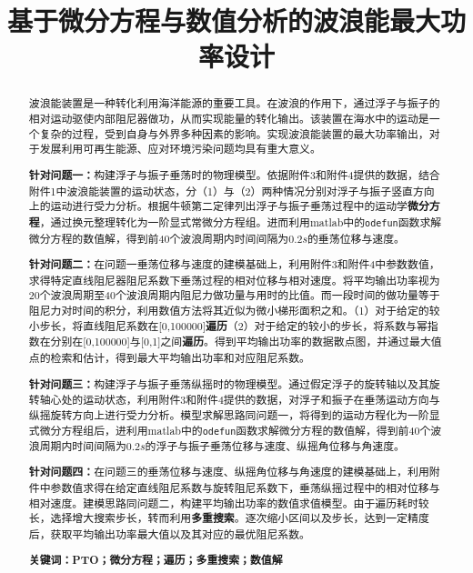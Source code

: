 \documentclass{article}
\date{}
\title{\heiti 基于微分方程与数值分析的波浪能最大功率设计}
\numberwithin{equation}{subsection}
\begin{document}
\maketitle
\vspace{-5em}%



\begin{abstract}
波浪能装置是一种转化利用海洋能源的重要工具。在波浪的作用下，通过浮子与振子的相对运动驱使内部阻尼器做功，从而实现能量的转化输出。该装置在海水中的运动是一个复杂的过程，受到自身与外界多种因素的影响。实现波浪能装置的最大功率输出，对于发展利用可再生能源、应对环境污染问题均具有重大意义。

\textbf{针对问题一：}构建浮子与振子垂荡时的物理模型。依据附件3和附件4提供的数据，结合附件1中波浪能装置的运动状态，分（1）与（2）两种情况分别对浮子与振子竖直方向上的运动进行受力分析。根据牛顿第二定律列出浮子与振子垂荡过程中的运动学\textbf{微分方程}，通过换元整理转化为一阶显式常微分方程组。进而利用matlab中的\verb|odefun|函数求解微分方程的数值解，得到前40个波浪周期内时间间隔为$0.2s$的垂荡位移与速度。

\textbf{针对问题二：}在问题一垂荡位移与速度的建模基础上，利用附件3和附件4中参数数值，求得特定直线阻尼器阻尼系数下垂荡过程的相对位移与相对速度。将平均输出功率视为20个波浪周期至40个波浪周期内阻尼力做功量与用时的比值。而一段时间的做功量等于阻尼力对时间的积分，利用数值方法将其近似为微小梯形面积之和。（1）对于给定的较小步长，将直线阻尼系数在[0,100000]\textbf{遍历}（2）对于给定的较小的步长，将系数与幂指数在分别在[0,100000]与[0,1]之间\textbf{遍历}。得到平均输出功率的数据散点图，并通过最大值点的检索和估计，得到最大平均输出功率和对应阻尼系数。

\textbf{针对问题三：}构建浮子与振子垂荡纵摇时的物理模型。通过假定浮子的旋转轴以及其旋转轴心处的运动状态，利用附件3和附件4提供的数据，对浮子和振子在垂荡运动方向与纵摇旋转方向上进行受力分析。模型求解思路同问题一，将得到的运动方程化为一阶显式微分方程组后，进利用matlab中的\verb|odefun|函数求解微分方程的数值解，得到前40个波浪周期内时间间隔为$0.2s$的浮子与振子垂荡位移与速度、纵摇角位移与角速度。

\textbf{针对问题四：}在问题三的垂荡位移与速度、纵摇角位移与角速度的建模基础上，利用附件中参数值求得在给定直线阻尼系数与旋转阻尼系数下，垂荡纵摇过程中的相对位移与相对速度。建模思路同问题二，构建平均输出功率的数值求值模型。由于遍历耗时较长，选择增大搜索步长，转而利用\textbf{多重搜索}。逐次缩小区间以及步长，达到一定精度后，获取平均输出功率最大值以及其对应的最优阻尼系数。

\textbf{关键词：PTO；微分方程；遍历；多重搜索；数值解}

\end{abstract}
\end{document}
